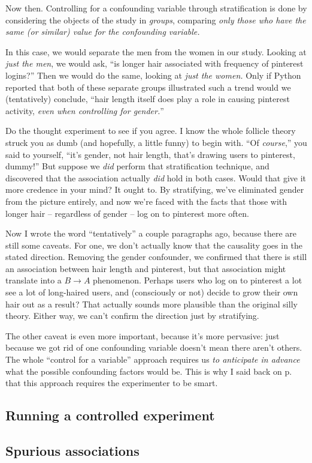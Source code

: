 
Now then. Controlling for a confounding variable through stratification is done
by considering the objects of the study in \textit{groups}, comparing
\textit{only those who have the same (or similar) value for the confounding
variable.}

In this case, we would separate the men from the women in our study. Looking at
\textit{just the men}, we would ask, ``is longer hair associated with frequency
of pinterest logins?'' Then we would do the same, looking at \textit{just the
women.} Only if Python reported that both of these separate groups illustrated
such a trend would we (tentatively) conclude, ``hair length itself does play a
role in causing pinterest activity, \textit{even when controlling for
gender.}''

Do the thought experiment to see if you agree. I know the whole follicle theory
struck you as dumb (and hopefully, a little funny) to begin with. ``Of
\textit{course},'' you said to yourself, ``it's gender, not hair length, that's
drawing users to pinterest, dummy!'' But suppose we \textit{did} perform that
stratification technique, and discovered that the association actually
\textit{did} hold in both cases. Would that give it more credence in your mind?
It ought to. By stratifying, we've eliminated gender from the picture entirely,
and now we're faced with the facts that those with longer hair -- regardless of
gender -- log on to pinterest more often. 


Now I wrote the word ``tentatively'' a couple paragraphs ago, because there are
still some caveats. For one, we don't actually know that the causality goes in
the stated direction. Removing the gender confounder, we confirmed that there
is still an association between hair length and pinterest, but that association
might translate into a $B \rightarrow A$ phenomenon. Perhaps users who log on
to pinterest a lot see a lot of long-haired users, and (consciously or not)
decide to grow their own hair out as a result? That actually sounds more
plausible than the original silly theory. Either way, we can't confirm the
direction just by stratifying.

The other caveat is even more important, because it's more pervasive: just
because we got rid of one confounding variable doesn't mean there aren't
others. The whole ``control for a variable'' approach requires us \textit{to
anticipate in advance} what the possible confounding factors would be. This is
why I said back on p.~\pageref{smart} that this approach requires the
experimenter to be smart.

\subsection{Running a controlled experiment}




\subsection{Spurious associations}

